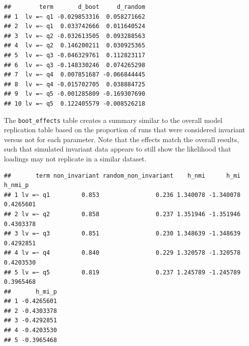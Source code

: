 \documentclass[
  man,floatsintext]{apa7}
\newenvironment{Shaded}{\begin{snugshade}}{\end{snugshade}}
\newcommand{\FunctionTok}[1]{\textcolor[rgb]{0.13,0.29,0.53}{\textbf{#1}}}
\newcommand{\NormalTok}[1]{#1}
\newcommand{\SpecialCharTok}[1]{\textcolor[rgb]{0.81,0.36,0.00}{\textbf{#1}}}
\begin{document}
\small

\begin{Shaded}
\end{Shaded}

\normalsize

\begin{verbatim}
##        term       d_boot     d_random
## 1  lv =~ q1 -0.029853316  0.058271662
## 2  lv =~ q1  0.033742666  0.011640524
## 3  lv =~ q2 -0.032613505  0.093288563
## 4  lv =~ q2  0.146200211  0.030925365
## 5  lv =~ q3 -0.046329761  0.112823117
## 6  lv =~ q3 -0.148330246  0.074265298
## 7  lv =~ q4  0.007851687 -0.066844445
## 8  lv =~ q4 -0.015702705  0.038884725
## 9  lv =~ q5 -0.001285809 -0.169307690
## 10 lv =~ q5  0.122405579 -0.008526218
\end{verbatim}

The \texttt{boot\_effects} table creates a summary similar to the overall model replication table based on the proportion of runs that were considered invariant versus not for each parameter. Note that the effects match the overall results, such that simulated invariant data appears to still show the likelihood that loadings may not replicate in a similar dataset.

\small

\begin{Shaded}
\end{Shaded}

\normalsize

\begin{verbatim}
##       term non_invariant random_non_invariant    h_nmi      h_mi   h_nmi_p
## 1 lv =~ q1         0.853                0.236 1.340078 -1.340078 0.4265601
## 2 lv =~ q2         0.858                0.237 1.351946 -1.351946 0.4303378
## 3 lv =~ q3         0.851                0.230 1.348639 -1.348639 0.4292851
## 4 lv =~ q4         0.840                0.229 1.320578 -1.320578 0.4203530
## 5 lv =~ q5         0.819                0.237 1.245789 -1.245789 0.3965468
##       h_mi_p
## 1 -0.4265601
## 2 -0.4303378
## 3 -0.4292851
## 4 -0.4203530
## 5 -0.3965468
\end{verbatim}
\end{document}
